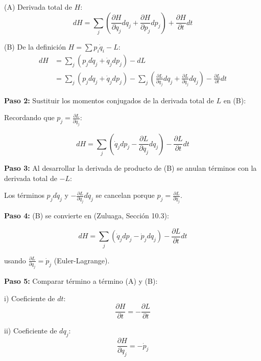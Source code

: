 \documentclass[a4paper]{article}
\begin{document}
(A) Derivada total de $H$:
\begin{equation}
dH = \sum_j \left(\frac{\partial H}{\partial q_j}dq_j + \frac{\partial H}{\partial p_j}dp_j\right) + \frac{\partial H}{\partial t}dt
\end{equation}

(B) De la definición $H = \sum p_i\dot{q}_i - L$:
\begin{align}
dH &= \sum_j (p_j d\dot{q}_j + \dot{q}_j dp_j) - dL \\
&= \sum_j (p_j d\dot{q}_j + \dot{q}_j dp_j) - \sum_j \left(\frac{\partial L}{\partial q_j}dq_j + \frac{\partial L}{\partial \dot{q}_j}d\dot{q}_j\right) - \frac{\partial L}{\partial t}dt
\end{align}

\textbf{Paso 2:} Sustituir los momentos conjugados de la derivada total de $L$ en (B):

Recordando que $p_j = \frac{\partial L}{\partial \dot{q}_j}$:

\begin{equation}
dH = \sum_j (\dot{q}_j dp_j - \frac{\partial L}{\partial q_j}dq_j) - \frac{\partial L}{\partial t}dt
\end{equation}

\textbf{Paso 3:} Al desarrollar la derivada de producto de (B) se anulan términos con la derivada total de $-L$:

Los términos $p_j d\dot{q}_j$ y $-\frac{\partial L}{\partial \dot{q}_j}d\dot{q}_j$ se cancelan porque $p_j = \frac{\partial L}{\partial \dot{q}_j}$.

\textbf{Paso 4:} (B) se convierte en (Zuluaga, Sección 10.3):

\begin{equation}
dH = \sum_j (\dot{q}_j dp_j - \dot{p}_j dq_j) - \frac{\partial L}{\partial t}dt
\end{equation}

usando $\frac{\partial L}{\partial q_j} = \dot{p}_j$ (Euler-Lagrange).

\textbf{Paso 5:} Comparar término a término (A) y (B):

i) Coeficiente de $dt$:
\begin{equation}
\frac{\partial H}{\partial t} = -\frac{\partial L}{\partial t}
\end{equation}

ii) Coeficiente de $dq_j$:
\begin{equation}
\frac{\partial H}{\partial q_j} = -\dot{p}_j
\end{equation}
\end{document}
